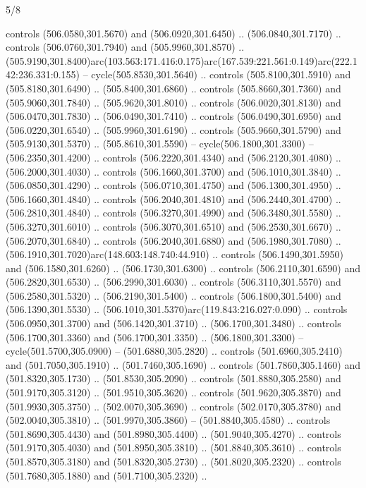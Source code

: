 \begin{flagdescription}{5/8}
\begin{scope}[xshift=0.5\flaglength,yshift=0.5\flagwidth,scale=\flagwidth/475.63]
\begin{scope}[y=0.8pt, x=0.8pt, yscale=-1, xscale=1,shift={(-450,-300)}]
\begin{scope}[cm={{1.0,0.0,0.0,1.0,(-0.0002,0.12556)}},cm={{1.0,0.0,0.0,1.0,(0.00179,0.0)}}]
\begin{scope}[cm={{1.11592,0.0,0.0,1.11592,(-106.89933,-41.77764)}}]
\begin{scope}[draw=black,fill=cfff]
\begin{scope}[fill=black]
  controls (506.0580,301.5670) and (506.0920,301.6450) .. (506.0840,301.7170) ..
  controls (506.0760,301.7940) and (505.9960,301.8570) ..
  (505.9190,301.8400)arc(103.563:171.416:0.175)arc(167.539:221.561:0.149)arc(222.142:236.331:0.155)
  -- cycle(505.8530,301.5640) .. controls (505.8100,301.5910) and
  (505.8180,301.6490) .. (505.8400,301.6860) .. controls (505.8660,301.7360) and
  (505.9060,301.7840) .. (505.9620,301.8010) .. controls (506.0020,301.8130) and
  (506.0470,301.7830) .. (506.0490,301.7410) .. controls (506.0490,301.6950) and
  (506.0220,301.6540) .. (505.9960,301.6190) .. controls (505.9660,301.5790) and
  (505.9130,301.5370) .. (505.8610,301.5590) -- cycle(506.1800,301.3300) --
  (506.2350,301.4200) .. controls (506.2220,301.4340) and (506.2120,301.4080) ..
  (506.2000,301.4030) .. controls (506.1660,301.3700) and (506.1010,301.3840) ..
  (506.0850,301.4290) .. controls (506.0710,301.4750) and (506.1300,301.4950) ..
  (506.1660,301.4840) .. controls (506.2040,301.4810) and (506.2440,301.4700) ..
  (506.2810,301.4840) .. controls (506.3270,301.4990) and (506.3480,301.5580) ..
  (506.3270,301.6010) .. controls (506.3070,301.6510) and (506.2530,301.6670) ..
  (506.2070,301.6840) .. controls (506.2040,301.6880) and (506.1980,301.7080) ..
  (506.1910,301.7020)arc(148.603:148.740:44.910) .. controls (506.1490,301.5950)
  and (506.1580,301.6260) .. (506.1730,301.6300) .. controls (506.2110,301.6590)
  and (506.2820,301.6530) .. (506.2990,301.6030) .. controls (506.3110,301.5570)
  and (506.2580,301.5320) .. (506.2190,301.5400) .. controls (506.1800,301.5400)
  and (506.1390,301.5530) .. (506.1010,301.5370)arc(119.843:216.027:0.090) ..
  controls (506.0950,301.3700) and (506.1420,301.3710) .. (506.1700,301.3480) ..
  controls (506.1700,301.3360) and (506.1700,301.3350) .. (506.1800,301.3300) --
  cycle(501.5700,305.0900) -- (501.6880,305.2820) .. controls
  (501.6960,305.2410) and (501.7050,305.1910) .. (501.7460,305.1690) .. controls
  (501.7860,305.1460) and (501.8320,305.1730) .. (501.8530,305.2090) .. controls
  (501.8880,305.2580) and (501.9170,305.3120) .. (501.9510,305.3620) .. controls
  (501.9620,305.3870) and (501.9930,305.3750) .. (502.0070,305.3690) .. controls
  (502.0170,305.3780) and (502.0040,305.3810) .. (501.9970,305.3860) --
  (501.8840,305.4580) .. controls (501.8690,305.4430) and (501.8980,305.4400) ..
  (501.9040,305.4270) .. controls (501.9170,305.4030) and (501.8950,305.3810) ..
  (501.8840,305.3610) .. controls (501.8570,305.3180) and (501.8320,305.2730) ..
  (501.8020,305.2320) .. controls (501.7680,305.1880) and (501.7100,305.2320) ..

\end{scope}
\end{scope}
\end{scope}
\end{scope}
\end{scope}
\end{scope}
\end{flagdescription}
